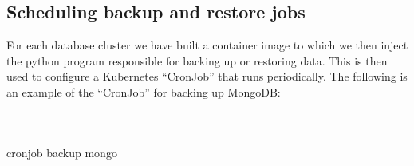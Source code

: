 \subsection{ Scheduling backup and restore jobs }

For each database cluster we have built a container image to which we then inject the python program responsible for backing up or restoring data. This is then used to configure a Kubernetes “CronJob” that runs periodically. The following is an example of the “CronJob” for backing up MongoDB: 



\begin{listing}
\inputminted[firstline=1,lastline=50]{Yaml}{codeListing/cronjob_backup_mongo.yml}
\end{listing}

\begin{listing}
\inputminted[firstline=51,lastline=100]{Yaml}{codeListing/cronjob_backup_mongo.yml}
\end{listing}

\begin{listing}
\inputminted[firstline=71]{Yaml}{codeListing/cronjob_backup_mongo.yml}
 \caption{cronjob backup mongo}
    \label{lst:cronjob backup mongo}
\end{listing}

